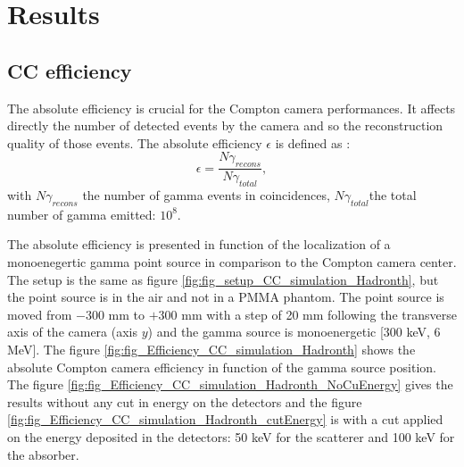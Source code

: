 
\section{Results}


\subsection{CC efficiency}




The absolute efficiency is crucial for the Compton camera performances. It affects directly the number of detected events by the camera and so the reconstruction quality of those events.
The absolute efficiency $\epsilon$ is defined as :
\begin{equation}
\epsilon =\frac{N\gamma_{recons}}{N\gamma_{total}},
\end{equation}
\label{eq:equation_efficacite_absolue}
with $N\gamma_{recons}$ the number of gamma events in coincidences,\newline
\hspace*{1cm}$N\gamma_{total}$the total number of gamma emitted: $10^8$.\newline

The absolute efficiency is presented in function of the localization of a monoenegertic gamma point source in comparison to the Compton camera center. The setup is the same as figure \ref{fig:fig_setup_CC_simulation_Hadronth}, but the point source is in the air and not in a PMMA phantom.
The point source is moved from $- 300$ mm to $+300$ mm with a step of 20 mm following the transverse axis of the camera (axis $y$) and the gamma source is monoenergetic [300 keV, 6 MeV]. \newline
The figure \ref{fig:fig_Efficiency_CC_simulation_Hadronth} shows the absolute Compton camera efficiency in function of the gamma source position. The figure \ref{fig:fig_Efficiency_CC_simulation_Hadronth_NoCuEnergy} gives the results without any cut in energy on the detectors and the figure \ref{fig:fig_Efficiency_CC_simulation_Hadronth_cutEnergy} is with a cut applied on the energy deposited in the detectors:  50 keV for the scatterer and 100 keV for the absorber.

